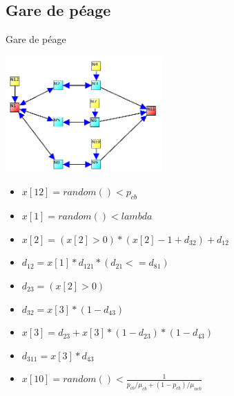 \documentclass{beamer}
\begin{document}
\subsection{Gare de péage}
  \begin{frame}{Gare de péage}
    \begin{vwcol}[widths={0.6,0.4}, sep=.0cm, rule=0pt] 
      \includegraphics[width=6cm]{../../procstochs/img/3_files.png}

      \tiny
      \begin{itemize}
        \item $x[12] = random() < p_{cb}$
        \item $x[1] = random() < lambda$
        \item $x[2] =(x[2]>0)*(x[2]-1+d_{32})+d_{12}$
        \item $d_{12} = x[1]*d_{121}*(d_{21}<=d_{81})$
        \item $d_{23} = (x[2]>0)$
        \item $d_{32} = x[3]*(1-d_{43})$
        \item $x[3] = d_{23} + x[3]*(1-d_{23})*(1-d_{43})$
        \item $d_{311} = x[3]*d_{43}$
        \item $x[10] = random() < \frac 1 {p_{cb}/\mu_{cb}+(1-p_{cb})/\mu_{ncb}}$
      \end{itemize}
    \end{vwcol}
  \end{frame}
\end{document}
